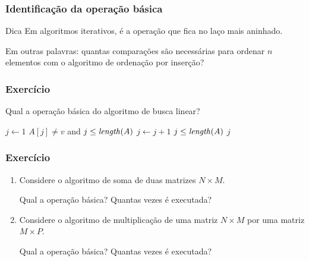 \documentclass{beamer}
\begin{document}
\begin{frame}
\frametitle{Identificação da operação básica}

\begin{block}{Dica}
Em algoritmos iterativos, é a operação que fica no laço mais aninhado.
\end{block}

\pause



  Em outras palavras: quantas comparações são necessárias para ordenar $n$
  elementos com o algoritmo de ordenação por inserção?

\end{frame}

\begin{frame}
  \frametitle{Exercício}

Qual a operação básica do algoritmo de busca linear?
\begin{codebox}
\li $j \gets 1$
\li \While $A[j] \neq v$ and $j \le \id{length}(A)$
\li \Do
      $j \gets j+1$
    \End
\li \If $j \le \id{length}(A)$
\li \Then
      \Return $j$
\li \Else
      \Return {}
    \End
\end{codebox}  

\end{frame}

\begin{frame}
  \frametitle{Exercício}

  \begin{enumerate}
  \item Considere o algoritmo de soma de duas matrizes $N \times M$.

    Qual a operação básica? Quantas vezes é executada?
  \item Considere o algoritmo de multiplicação de uma matriz $N \times M$ 
    por uma matriz $M \times P$.

    Qual a operação básica? Quantas vezes é executada?
  \end{enumerate}

\end{frame}
\end{document}
